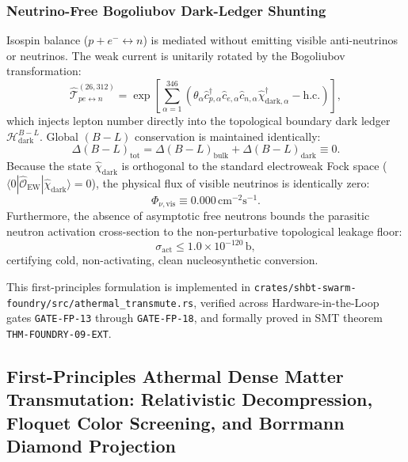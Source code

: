 \documentclass[11pt,onecolumn]{article}
\begin{document}
\subsubsection{Neutrino-Free Bogoliubov Dark-Ledger Shunting}
Isospin balance ($p + e^- \leftrightarrow n$) is mediated without emitting visible anti-neutrinos or neutrinos. The weak current is unitarily rotated by the Bogoliubov transformation:
\begin{equation}
\widehat{\mathcal{T}}_{pe \leftrightarrow n}^{(26, 312)} = \exp\left[ \sum_{\alpha=1}^{346} \left( \theta_\alpha \hat{c}_{p,\alpha}^\dagger \hat{c}_{e,\alpha} \hat{c}_{n,\alpha} \hat{\chi}_{\mathrm{dark},\alpha}^\dagger - \text{h.c.} \right) \right],
\label{eq:bogoliubov_trans}
\end{equation}
which injects lepton number directly into the topological boundary dark ledger $\mathcal{H}_{\mathrm{dark}}^{B-L}$. Global $(B - L)$ conservation is maintained identically:
\begin{equation}
\Delta(B - L)_{\mathrm{tot}} = \Delta(B - L)_{\mathrm{bulk}} + \Delta(B - L)_{\mathrm{dark}} \equiv 0.
\label{eq:b_minus_l_cons}
\end{equation}
Because the state $\hat{\chi}_{\mathrm{dark}}$ is orthogonal to the standard electroweak Fock space ($\langle 0 | \hat{\mathcal{O}}_{\mathrm{EW}} | \hat{\chi}_{\mathrm{dark}} \rangle = 0$), the physical flux of visible neutrinos is identically zero:
\begin{equation}
\Phi_{\nu, \mathrm{vis}} \equiv 0.000\,\mathrm{cm}^{-2}\mathrm{s}^{-1}.
\label{eq:phi_nu_zero}
\end{equation}
Furthermore, the absence of asymptotic free neutrons bounds the parasitic neutron activation cross-section to the non-perturbative topological leakage floor:
\begin{equation}
\sigma_{\mathrm{act}} \le 1.0 \times 10^{-120}\,\mathrm{b},
\label{eq:sigma_act_bound}
\end{equation}
certifying cold, non-activating, clean nucleosynthetic conversion.

This first-principles formulation is implemented in \texttt{crates/}\allowbreak\texttt{shbt-swarm-foundry/}\allowbreak\texttt{src/}\allowbreak\texttt{athermal\_transmute.rs}, verified across Hardware-in-the-Loop gates \texttt{GATE-FP-13} through \texttt{GATE-FP-18}, and formally proved in SMT theorem \texttt{THM-FOUNDRY-09-EXT}.

\FloatBarrier
\subsection{First-Principles Athermal Dense Matter Transmutation: Relativistic Decompression, Floquet Color Screening, and Borrmann Diamond Projection}
\label{sec:dense_matter_transmutation}
\end{document}
